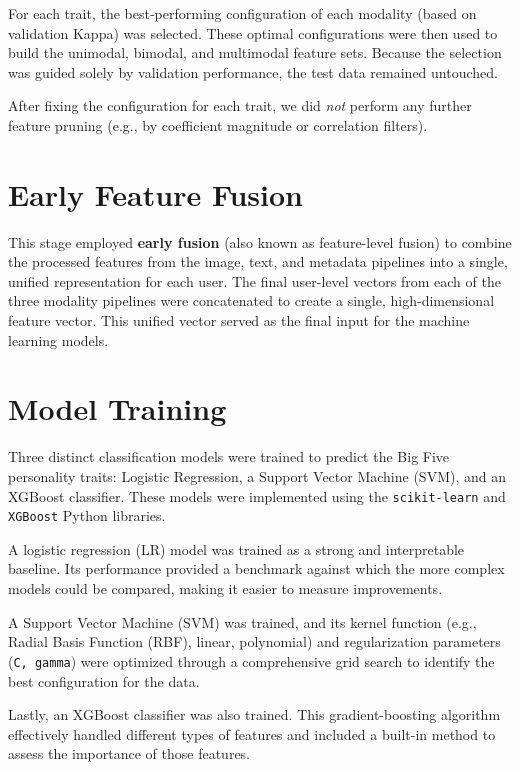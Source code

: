 For each trait, the best‑performing configuration of each modality (based on validation Kappa) was selected. These optimal configurations were then used to build the unimodal, bimodal, and multimodal feature sets. Because the selection was guided solely by validation performance, the test data remained untouched.

After fixing the configuration for each trait, we did \textit{not} perform any further feature pruning (e.g., by coefficient magnitude or correlation filters). 

\section{Early Feature Fusion}
\label{subsec:fusion}
This stage employed \textbf{early fusion} (also known as feature-level fusion) to combine the processed features from the image, text, and metadata pipelines into a single, unified representation for each user. The final user-level vectors from each of the three modality pipelines were concatenated to create a single, high-dimensional feature vector. This unified vector served as the final input for the machine learning models.

\section{Model Training}
\label{subsec:models}

Three distinct classification models were trained to predict the Big Five personality traits: Logistic Regression, a Support Vector Machine (SVM), and an XGBoost classifier. These models were implemented using the \texttt{scikit-learn} \citep{pedregosa2011} and \texttt{XGBoost} \citep{chen2016} Python libraries.

A logistic regression (LR) model was trained as a strong and interpretable baseline. Its performance provided a benchmark against which the more complex models could be compared, making it easier to measure improvements.

A Support Vector Machine (SVM) was trained, and its kernel function (e.g., Radial Basis Function (RBF), linear, polynomial) and regularization parameters (\texttt{C, gamma}) were optimized through a comprehensive grid search to identify the best configuration for the data.

Lastly, an XGBoost classifier was also trained. This gradient-boosting algorithm effectively handled different types of features and included a built-in method to assess the importance of those features.

